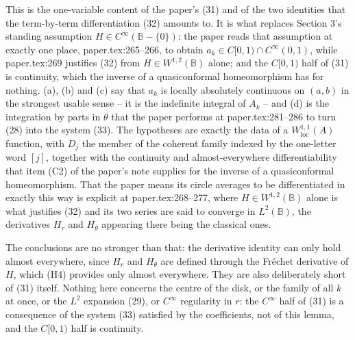 \begin{lemma}
This is the one-variable content of the paper's (31) and of the two identities
that the term-by-term differentiation (32) amounts to.  It is what replaces
Section 3's standing assumption $H\in C^\infty(\mathbb{B}-\{0\})$: the paper
reads that assumption at exactly one place, paper.tex:265--266, to obtain
$a_k\in C[0,1)\cap C^\infty(0,1)$, while paper.tex:269 justifies (32) from
$H\in W^{1,2}(\mathbb{B})$ alone; and the $C[0,1)$ half of (31) is continuity,
which the inverse of a quasiconformal homeomorphism has for nothing.  (a), (b)
and (c) say that $a_k$ is locally absolutely continuous on $(a,b)$ in the
strongest usable sense -- it is the indefinite integral of $A_k$ -- and (d) is
the integration by parts in $\theta$ that the paper performs at
paper.tex:281--286 to turn (28) into the system (33).  The hypotheses are
exactly the data of a $W^{1,1}_{\mathrm{loc}}(A)$ function, with $D_j$ the
member of the coherent family indexed by the one-letter word $[j]$, together
with the continuity and almost-everywhere differentiability that item (C2) of
the paper's note supplies for the inverse of a quasiconformal homeomorphism.
That the paper means its circle averages to be differentiated in exactly this
way is explicit at paper.tex:268--277, where $H\in W^{1,2}(\mathbb{B})$ alone
is what justifies (32) and its two series are said to converge in
$L^{2}(\mathbb{B})$, the derivatives $H_r$ and $H_\theta$ appearing there being
the classical ones.

The conclusions are no stronger than that: the derivative identity can only
hold almost everywhere, since $H_r$ and $H_\theta$ are defined through the
Fr\'echet derivative of $H$, which (H4) provides only almost everywhere.  They
are also deliberately short of (31) itself.  Nothing here concerns the centre
of the disk, or the family of all $k$ at once, or the $L^{2}$ expansion (29),
or $C^\infty$ regularity in $r$: the $C^\infty$ half of (31) is a consequence
of the system (33) satisfied by the coefficients, not of this lemma, and the
$C[0,1)$ half is continuity.
\end{lemma}
